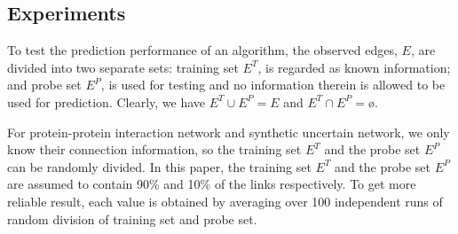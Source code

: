 \documentclass[\main/thesis.tex]{subfiles}
\begin{document}
\subsection{Experiments}
To test the prediction performance of an algorithm, the observed edges, $E$, are divided into two separate sets: training set $E^T$, is regarded as known information; and probe set $E^P$, is used for testing and no information therein is allowed to be used for prediction. Clearly, we have $E^T \cup E^P = E$ and $E^T \cap E^P = $\o. 

For protein-protein interaction network and synthetic uncertain network, we only know their connection information, so the training set $E^T$ and the probe set $E^P$ can be randomly divided. In this paper, the training set $E^T$ and the probe set $E^P$ are assumed to contain 90\% and 10\% of the links respectively. To get more reliable result, each value is obtained by averaging over 100 independent runs of random division of training set and probe set.
\end{document}
